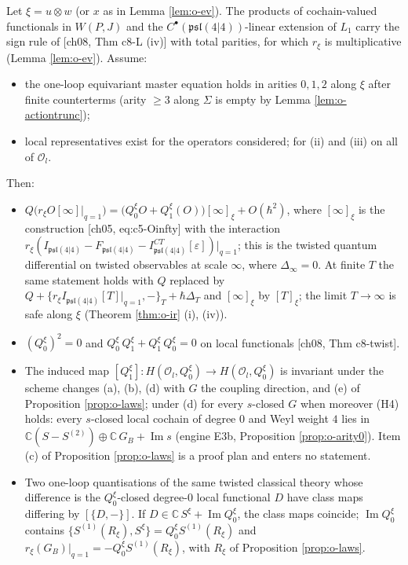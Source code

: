\begin{theorem}
\label{thm:o-twist}
Let $\xi=u\otimes w$ (or $x$ as in Lemma \ref{lem:o-ev}). The products of cochain-valued functionals in $W(P,J)$ and the $C^\bullet(\mathfrak{psl}(4|4))$-linear extension of $L_1$ carry the sign rule of [ch08, Thm c8-L (iv)] with total parities, for which $r_\xi$ is multiplicative (Lemma \ref{lem:o-ev}). Assume:
\begin{itemize}
\item[(H2)] the one-loop equivariant master equation holds in arities $0,1,2$ along $\xi$ after finite counterterms (arity $\ge3$ along $\Sigma$ is empty by Lemma \ref{lem:o-actiontrunc});
\item[(H3)] local representatives exist for the operators considered; for (ii) and (iii) on all of $\mathscr O_l$.
\end{itemize}
Then:
\begin{itemize}
\item[(i)] $Q\big(r_\xi O[\infty]|_{q=1}\big)=\big(Q^\xi_0O+Q^\xi_1(O)\big)[\infty]_\xi+O(\hbar^2)$, where $[\infty]_\xi$ is the construction [ch05, eq:c5-Oinfty] with the interaction $r_\xi(I_{\mathfrak{psl}(4|4)}-F_{\mathfrak{psl}(4|4)}-I^{CT}_{\mathfrak{psl}(4|4)}[\varepsilon])|_{q=1}$; this is the twisted quantum differential on twisted observables at scale $\infty$, where $\Delta_\infty=0$. At finite $T$ the same statement holds with $Q$ replaced by $Q+\{r_\xi I_{\mathfrak{psl}(4|4)}[T]|_{q=1},-\}_T+\hbar\Delta_T$ and $[\infty]_\xi$ by $[T]_\xi$; the limit $T\to\infty$ is safe along $\xi$ (Theorem \ref{thm:o-ir} (i), (iv)).
\item[(ii)] $(Q^\xi_0)^2=0$ and $Q^\xi_0\,Q^\xi_1+Q^\xi_1\,Q^\xi_0=0$ on local functionals [ch08, Thm c8-twist].
\item[(iii)] The induced map $[Q^\xi_1]\colon H(\mathscr O_l,Q^\xi_0)\to H(\mathscr O_l,Q^\xi_0)$ is invariant under the scheme changes (a), (b), (d) with $G$ the coupling direction, and (e) of Proposition \ref{prop:o-laws}; under (d) for every $s$-closed $G$ when moreover (H4) holds: every $s$-closed local cochain of degree $0$ and Weyl weight $4$ lies in $\mathbb C(S-S^{(2)})\oplus\mathbb C\,G_B+\operatorname{Im}s$ (engine E3b, Proposition \ref{prop:o-arity0}). Item (c) of Proposition \ref{prop:o-laws} is a proof plan and enters no statement.
\item[(iv)] Two one-loop quantisations of the same twisted classical theory whose difference is the $Q^\xi_0$-closed degree-$0$ local functional $D$ have class maps differing by $[\{D,-\}]$. If $D\in\mathbb C\,S^\xi+\operatorname{Im}Q^\xi_0$, the class maps coincide; $\operatorname{Im}Q^\xi_0$ contains $\{S^{(1)}(R_\xi),S^\xi\}=Q^\xi_0S^{(1)}(R_\xi)$ and $r_\xi(G_B)|_{q=1}=-Q^\xi_0S^{(1)}(R_\xi)$, with $R_\xi$ of Proposition \ref{prop:o-laws}.
\end{itemize}
\end{theorem}

